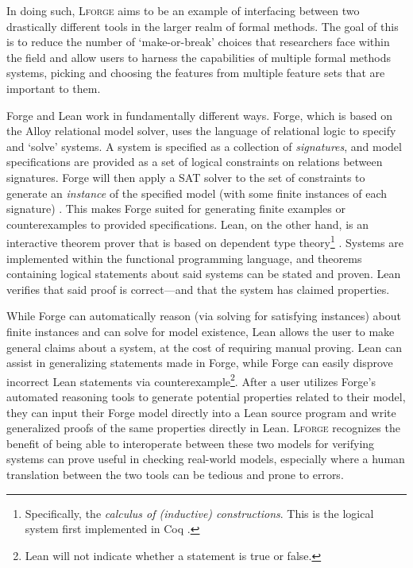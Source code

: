 In doing such, \textsc{Lforge} aims to be an example of interfacing between two drastically different tools in the larger realm of formal methods. The goal of this is to reduce the number of `make-or-break' choices that researchers face within the field and allow users to harness the capabilities of multiple formal methods systems, picking and choosing the features from multiple feature sets that are important to them. 

Forge and Lean work in fundamentally different ways. Forge, which is based on the Alloy relational model solver, uses the language of relational logic to specify and `solve' systems. A system is specified as a collection of \emph{signatures}, and model specifications are provided as a set of logical constraints on relations between signatures. Forge will then apply a SAT solver to the set of constraints to generate an \emph{instance} of the specified model (with some finite instances of each signature) \cite{jackson2019alloy,ngpdbccdlrrvwwk-oopsla-2024}. This makes Forge suited for generating finite examples or counterexamples to provided specifications. Lean, on the other hand, is an interactive theorem prover that is based on dependent type theory\footnote{Specifically, the \emph{calculus of (inductive) constructions}. This is the logical system first implemented in Coq \cite{bertot2008short}.} \cite{avigad2024theorem}. Systems are implemented within the functional programming language, and theorems containing logical statements about said systems can be stated and proven. Lean verifies that said proof is correct---and that the system has claimed properties.

While Forge can automatically reason (via solving for satisfying instances) about finite instances and can solve for model existence, Lean allows the user to make general claims about a system, at the cost of requiring manual proving. Lean can assist in generalizing statements made in Forge, while Forge can easily disprove incorrect Lean statements via counterexample\footnote{Lean will not indicate whether a statement is true or false.}. After a user utilizes Forge's automated reasoning tools to generate potential properties related to their model, they can input their Forge model directly into a Lean source program and write generalized proofs of the same properties directly in Lean. \textsc{Lforge} recognizes the benefit of being able to interoperate between these two models for verifying systems can prove useful in checking real-world models, especially where a human translation between the two tools can be tedious and prone to errors. 

